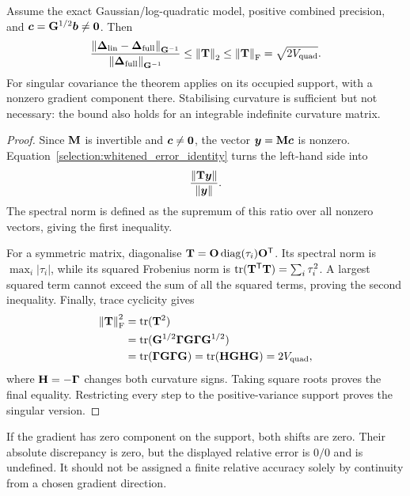\begin{theorem}
\label{selection:relative_bound}
Assume the exact Gaussian/log-quadratic model, positive combined
precision, and $\boldsymbol{c}=\mathbf{G}^{1/2}\boldsymbol{b}\ne\boldsymbol{0}$. Then
\begin{equation}
\frac{\left\lVert \boldsymbol{\Delta}_{\mathrm{lin}}-
                  \boldsymbol{\Delta}_{\mathrm{full}}\right\rVert_{\mathbf{G}^{-1}}}
     {\left\lVert \boldsymbol{\Delta}_{\mathrm{full}}\right\rVert_{\mathbf{G}^{-1}}}
 \leq\left\lVert \mathbf{T}\right\rVert_2
 \leq\left\lVert \mathbf{T}\right\rVert_{\mathrm F}
 =\sqrt{2V_{\mathrm{quad}}}.
\label{selection:full_bound}
\end{equation}
For singular covariance the theorem applies on its occupied support,
with a nonzero gradient component there. Stabilising curvature is
sufficient but not necessary: the bound also holds for an integrable
indefinite curvature matrix.
\end{theorem}
\begin{proof}
Since $\mathbf{M}$ is invertible and $\boldsymbol{c}\ne\boldsymbol{0}$, the vector
$\boldsymbol{y}=\mathbf{M}\boldsymbol{c}$ is nonzero. Equation~\eqref{selection:whitened_error_identity}
turns the left-hand side into
\[
\frac{\left\lVert \mathbf{T}\boldsymbol{y}\right\rVert}{\left\lVert \boldsymbol{y}\right\rVert}.
\]
The spectral norm is defined as the supremum of this ratio over all
nonzero vectors, giving the first inequality.

For a symmetric matrix, diagonalise
$\mathbf{T}=\mathbf{O}\operatorname{diag}(\tau_i)\mathbf{O}^{\mathsf T}$.
Its spectral norm is $\max_i|\tau_i|$, while its squared Frobenius norm
is $\operatorname{tr}(\mathbf{T}^{\mathsf T}\mathbf{T})=\sum_i\tau_i^2$. A largest squared
term cannot exceed the sum of all the squared terms, proving the second
inequality. Finally, trace cyclicity gives
\begin{align}
\left\lVert \mathbf{T}\right\rVert_{\mathrm F}^2
 &=\operatorname{tr}(\mathbf{T}^2)\nonumber\\
 &=\operatorname{tr}(\mathbf{G}^{1/2}\boldsymbol{\Gamma}\mathbf{G}\boldsymbol{\Gamma}\mathbf{G}^{1/2})\nonumber\\
 &=\operatorname{tr}(\boldsymbol{\Gamma}\mathbf{G}\boldsymbol{\Gamma}\mathbf{G})
   =\operatorname{tr}(\mathbf{H}\mathbf{G}\mathbf{H}\mathbf{G})=2V_{\mathrm{quad}},
\end{align}
where $\mathbf{H}=-\boldsymbol{\Gamma}$ changes both curvature signs. Taking square
roots proves the final equality. Restricting every step to the
positive-variance support proves the singular version.
\end{proof}

If the gradient has zero component on the support, both shifts are zero.
Their absolute discrepancy is zero, but the displayed relative error is
$0/0$ and is undefined. It should not be assigned a finite relative
accuracy solely by continuity from a chosen gradient direction.

